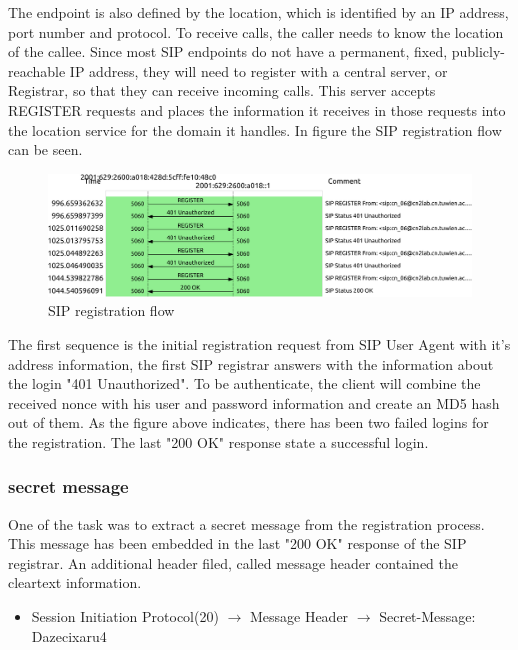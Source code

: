 \documentclass[parskip=full]{scrartcl}
\begin{document}
The endpoint is also defined by the location, which is identified by an IP address, port number and protocol. To receive calls, the caller needs to know the location of the callee. Since most SIP endpoints do not have a permanent, fixed, publicly-reachable IP address, they will need to register with a central server, or Registrar, so that they can receive incoming calls. This server accepts REGISTER requests and places the information it receives in those requests into the location service for the domain it handles. In figure  the SIP registration flow can be seen. 

\begin{figure}[!ht]
	\centering %
	\includegraphics[width=\textwidth]{images/FlowSeqReg.pdf} %
	\caption{SIP registration flow} 
	\label{fig:SIP Registrar} %
\end{figure}

The first sequence is the initial registration request from SIP User Agent with it's address information, the first SIP registrar answers with the information about the login "401 Unauthorized". To be authenticate, the client will combine the received nonce with his user and password information and create an MD5 hash out of them. As the figure above indicates, there has been two failed logins for the registration. The last "200 OK" response state a successful login.

\subsubsection{secret message}
One of the task was to extract a secret message from the registration process. This message has been embedded in the last "200 OK" response of the SIP registrar. An additional header filed, called message header contained the cleartext information.

\begin{itemize}
	\item Session Initiation Protocol(20) $\to$ Message Header $\to$ Secret-Message: Dazecixaru4
\end{itemize}
\end{document}
